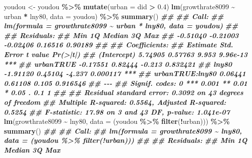 \documentclass[
]{book}
\newenvironment{Shaded}{\begin{snugshade}}{\end{snugshade}}
\newcommand{\AttributeTok}[1]{\textcolor[rgb]{0.13,0.29,0.53}{#1}}
\newcommand{\DocumentationTok}[1]{\textcolor[rgb]{0.56,0.35,0.01}{\textbf{\textit{#1}}}}
\newcommand{\FloatTok}[1]{\textcolor[rgb]{0.00,0.00,0.81}{#1}}
\newcommand{\FunctionTok}[1]{\textcolor[rgb]{0.13,0.29,0.53}{\textbf{#1}}}
\newcommand{\NormalTok}[1]{#1}
\newcommand{\OtherTok}[1]{\textcolor[rgb]{0.56,0.35,0.01}{#1}}
\newcommand{\SpecialCharTok}[1]{\textcolor[rgb]{0.81,0.36,0.00}{\textbf{#1}}}
\begin{document}
\begin{Shaded}
\begin{Highlighting}[]
\NormalTok{youdou }\OtherTok{\textless{}{-}}\NormalTok{ youdou }\SpecialCharTok{\%\textgreater{}\%}
    \FunctionTok{mutate}\NormalTok{(}\AttributeTok{urban =}\NormalTok{ did }\SpecialCharTok{\textgreater{}} \FloatTok{0.4}\NormalTok{)}
\FunctionTok{lm}\NormalTok{(growthrate8099 }\SpecialCharTok{\textasciitilde{}}\NormalTok{ urban }\SpecialCharTok{*}\NormalTok{ lny80, }\AttributeTok{data =}\NormalTok{ youdou) }\SpecialCharTok{\%\textgreater{}\%} \FunctionTok{summary}\NormalTok{()}
\DocumentationTok{\#\# }
\DocumentationTok{\#\# Call:}
\DocumentationTok{\#\# lm(formula = growthrate8099 \textasciitilde{} urban * lny80, data = youdou)}
\DocumentationTok{\#\# }
\DocumentationTok{\#\# Residuals:}
\DocumentationTok{\#\#      Min       1Q   Median       3Q      Max }
\DocumentationTok{\#\# {-}0.51040 {-}0.21003 {-}0.02406  0.16516  0.90189 }
\DocumentationTok{\#\# }
\DocumentationTok{\#\# Coefficients:}
\DocumentationTok{\#\#                 Estimate Std. Error t value Pr(\textgreater{}|t|)    }
\DocumentationTok{\#\# (Intercept)      5.74905    0.57763   9.953 9.96e{-}13 ***}
\DocumentationTok{\#\# urbanTRUE       {-}0.17551    0.82444  {-}0.213 0.832421    }
\DocumentationTok{\#\# lny80           {-}1.91120    0.45104  {-}4.237 0.000117 ***}
\DocumentationTok{\#\# urbanTRUE:lny80  0.06441    0.61108   0.105 0.916546    }
\DocumentationTok{\#\# {-}{-}{-}}
\DocumentationTok{\#\# Signif. codes:  0 \textquotesingle{}***\textquotesingle{} 0.001 \textquotesingle{}**\textquotesingle{} 0.01 \textquotesingle{}*\textquotesingle{} 0.05 \textquotesingle{}.\textquotesingle{} 0.1 \textquotesingle{} \textquotesingle{} 1}
\DocumentationTok{\#\# }
\DocumentationTok{\#\# Residual standard error: 0.3092 on 43 degrees of freedom}
\DocumentationTok{\#\# Multiple R{-}squared:  0.5564, Adjusted R{-}squared:  0.5254 }
\DocumentationTok{\#\# F{-}statistic: 17.98 on 3 and 43 DF,  p{-}value: 1.041e{-}07}
\FunctionTok{lm}\NormalTok{(growthrate8099 }\SpecialCharTok{\textasciitilde{}}\NormalTok{ lny80, }\AttributeTok{data =}\NormalTok{ (youdou }\SpecialCharTok{\%\textgreater{}\%} \FunctionTok{filter}\NormalTok{(}\SpecialCharTok{!}\NormalTok{urban))) }\SpecialCharTok{\%\textgreater{}\%} \FunctionTok{summary}\NormalTok{()}
\DocumentationTok{\#\# }
\DocumentationTok{\#\# Call:}
\DocumentationTok{\#\# lm(formula = growthrate8099 \textasciitilde{} lny80, data = (youdou \%\textgreater{}\% filter(!urban)))}
\DocumentationTok{\#\# }
\DocumentationTok{\#\# Residuals:}
\DocumentationTok{\#\#      Min       1Q   Median       3Q      Max }

\end{Highlighting}
\end{Shaded}
\end{document}
